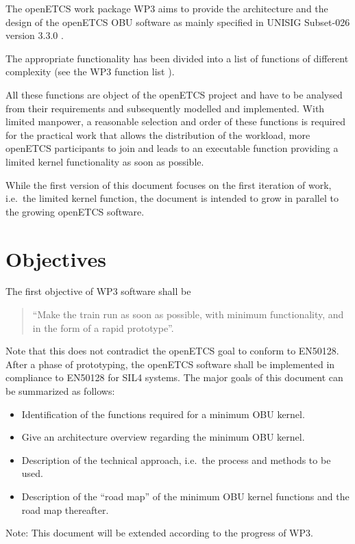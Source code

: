 \documentclass{template/openetcs_report}
\begin{document}
The openETCS work package WP3 aims to provide the architecture and the design of the openETCS OBU software as mainly specified in UNISIG Subset-026 version 3.3.0 \cite{subset-026}. 

The appropriate functionality has been divided into a list of functions of different complexity (see the WP3 function list \cite{functions}).

All these functions are object of the openETCS project and have to be analysed from their requirements and subsequently modelled and implemented. With limited manpower, a reasonable selection and order of these functions is required for the practical work that allows the distribution of the workload, more openETCS participants to join and leads to an executable function providing a limited kernel functionality as soon as possible. 

While the first version of this document focuses on the first iteration of work, i.e.~the limited kernel function, the document is intended to grow in parallel to the growing openETCS software.


\section{Objectives}
\label{sec:Objectives}


The first objective of WP3 software shall be
\begin{quote}
	``Make the train run as soon as possible, with minimum functionality, and in the form of a rapid prototype''.
\end{quote}
Note that this does not contradict the openETCS goal to conform to EN50128. After a phase of prototyping, the openETCS software shall be implemented in compliance to EN50128 for SIL4 systems. The major goals of this document can be summarized as follows:
\begin{itemize}
	\item Identification of the functions required for a minimum OBU kernel.
	\item Give an architecture overview regarding the minimum OBU kernel.
	\item Description of the technical approach, i.e.~the process and methods to be used.
	\item Description of the ``road map'' of the minimum OBU kernel functions and the road map thereafter.
\end{itemize}
Note: This document will be extended according to the progress of WP3. 
\end{document}
